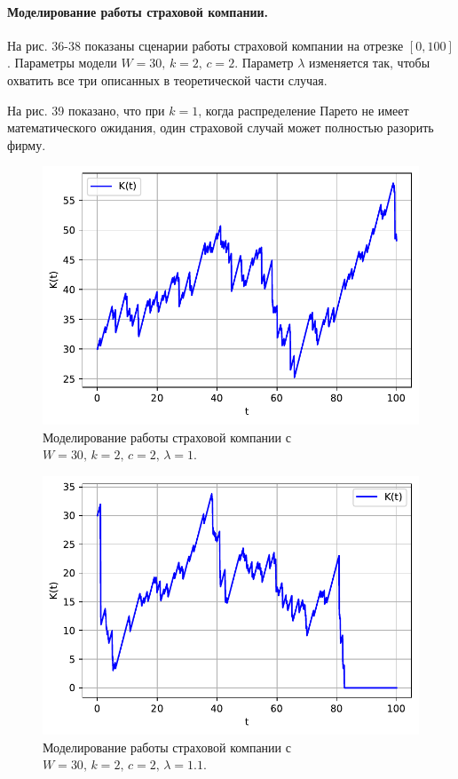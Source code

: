 \documentclass[16pt]{article}
\begin{document}
\paragraph{Моделирование работы страховой компании.} На рис. 36-38 показаны сценарии работы страховой компании на отрезке $[0, 100]$. Параметры модели $W = 30,\, k = 2,\, c = 2$.  Параметр $\lambda$ изменяется так, чтобы охватить все три описанных в теоретической части случая.

На рис. 39 показано, что при $k = 1$, когда распределение Парето не имеет математического ожидания, один страховой случай может полностью разорить фирму.

\begin{figure}
	\center
	\includegraphics[scale=0.7]{11_5.pdf}
	\caption{Моделирование работы страховой компании с $W = 30,\, k = 2,\, c = 2,\, \lambda = 1$.}
\end{figure}

\begin{figure}
	\center
	\includegraphics[scale=0.7]{11_6.pdf}
	\caption{Моделирование работы страховой компании с $W = 30,\, k = 2,\, c = 2,\, \lambda = 1.1$.}
\end{figure}
\end{document}
